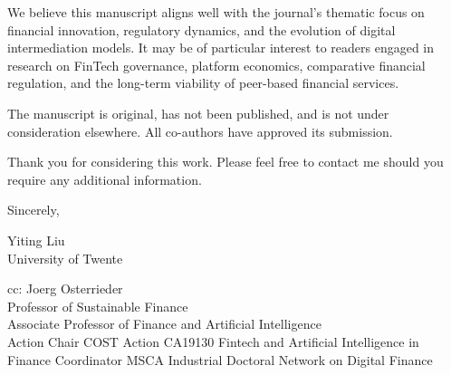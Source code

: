 \documentclass{article}[a4paper]
\newcommand{\XSignature}{\calligra{Yiting Liu}\normalfont} %
\begin{document}
We believe this manuscript aligns well with the journal’s thematic focus on financial innovation, regulatory dynamics, and the evolution of digital intermediation models. It may be of particular interest to readers engaged in research on FinTech governance, platform economics, comparative financial regulation, and the long-term viability of peer-based financial services.

The manuscript is original, has not been published, and is not under consideration elsewhere. All co-authors have approved its submission.

Thank you for considering this work. Please feel free to contact me should you require any additional information.

Sincerely,

\vspace{1em} %

\noindent
\XSignature

Yiting Liu\\
University of Twente
\newline

cc: Joerg Osterrieder\\
Professor of Sustainable Finance\\
Associate Professor of Finance and Artificial Intelligence\\
Action Chair COST Action CA19130 Fintech and Artificial Intelligence in Finance
Coordinator MSCA Industrial Doctoral Network on Digital Finance
\newpage


\newpage

\newpage
\end{document}
